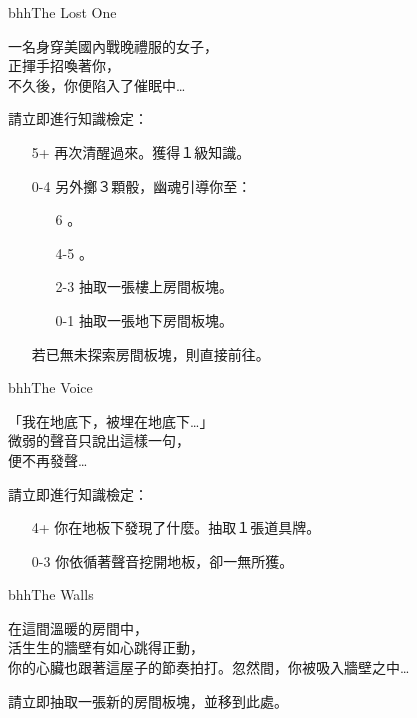 \begin{EventCard}{bhh}{The Lost One}
  \begin{CardStory}
    一名身穿美國內戰晚禮服的女子，\\
    正揮手招喚著你，\\
    不久後，你便陷入了催眠中…
  \end{CardStory}
  \footnotesize
  請立即進行知識檢定：
  \begin{itemize}
    \item[5+] 再次清醒過來。獲得１級知識。
    \item[0-4] 另外擲３顆骰，幽魂引導你至：
      \begin{itemize}
        \item[6] 。
        \item[4-5] 。
        \item[2-3] 抽取一張樓上房間板塊。
        \item[0-1] 抽取一張地下房間板塊。
      \end{itemize}
      若已無未探索房間板塊，則直接前往。
  \end{itemize}
\end{EventCard}%
\linebreak[0]%
\begin{EventCard}{bhh}{The Voice}
  \begin{CardStory}
    「我在地底下，被埋在地底下…」\\
    微弱的聲音只說出這樣一句，\\
    便不再發聲…
  \end{CardStory}
  請立即進行知識檢定：
  \begin{itemize}
    \item[4+] 你在地板下發現了什麼。抽取１張道具牌。
    \item[0-3] 你依循著聲音挖開地板，卻一無所獲。
  \end{itemize}
\end{EventCard}%
\linebreak[0]%
\begin{EventCard}{bhh}{The Walls}
  \begin{CardStory}
    在這間溫暖的房間中，\\
    活生生的牆壁有如心跳得正動，\\
    你的心臟也跟著這屋子的節奏拍打。忽然間，你被吸入牆壁之中…
  \end{CardStory}
  請立即抽取一張新的房間板塊，並移到此處。\smallbreak
\end{EventCard}%
